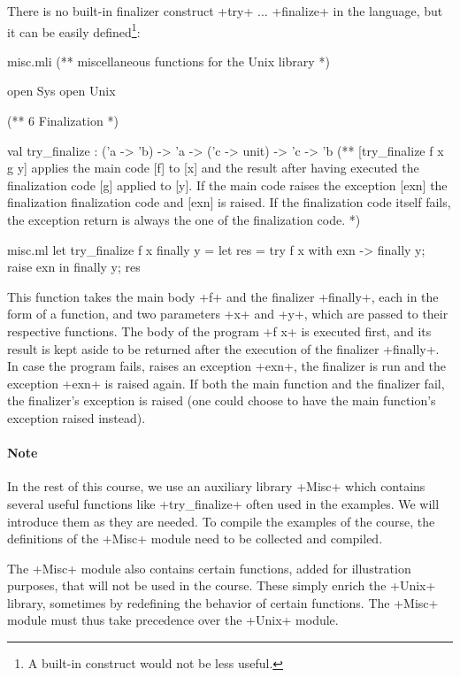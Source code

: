 There is no built-in finalizer construct \ml+try+ ... \ml+finalize+ in
the {\ocaml} language, but it can be easily defined\footnote{A
  built-in construct would not be less useful.}:
\begin{codefile}{misc.mli}
(** miscellaneous functions for the Unix library *)

open Sys
open Unix

(** {6 Finalization} *)

val try_finalize : ('a -> 'b) -> 'a -> ('c -> unit) -> 'c -> 'b
(** [try_finalize f x g y] applies the main code [f] to [x] and
    the result after having executed the finalization 
   code [g] applied to [y]. If the main code raises the exception
   [exn] the finalization finalization code and [exn] is raised.
   If the finalization code itself fails, the exception
   return is always the one of the finalization code. *)
\end{codefile}
%
\begin{listingcodefile}{misc.ml}
let try_finalize f x finally y =
  let res = try f x with exn -> finally y; raise exn in 
  finally y; 
  res
\end{listingcodefile}
%
This function takes the main body \ml+f+ and the finalizer
\ml+finally+, each in the form of a function, and two parameters \ml+x+
and \ml+y+, which are passed to their respective functions. The body
of the program \ml+f x+ is executed first, and its result is kept
aside to be returned after the execution of the finalizer 
\ml+finally+. In case the program fails, \ie{} raises an exception \ml+exn+,
the finalizer is run and the exception \ml+exn+ is raised
again. If both the main function and the finalizer fail, the
finalizer's exception is raised (one could choose to have the main
function's exception raised instead).

\paragraph{Note}

In the rest of this course, we use an auxiliary library \ml+Misc+
which contains several useful functions like \ml+try_finalize+ often
used in the examples. We will introduce them as they are needed. To
compile the examples of the course, the definitions of the \ml+Misc+
module need to be collected and compiled.

The \ml+Misc+ module also contains certain functions, added for
illustration purposes, that will not be used in the course. These
simply enrich the \ml+Unix+ library, sometimes by redefining the
behavior of certain functions.  The \ml+Misc+ module must thus take
precedence over the \ml+Unix+ module.

